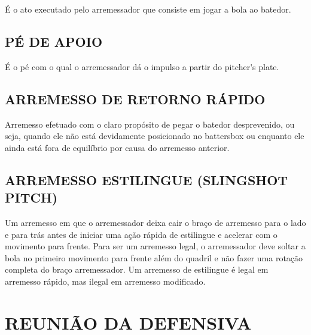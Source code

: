 É o ato executado pelo arremessador que consiste em jogar a bola ao batedor.

\subsection{PÉ DE APOIO}

É o pé com o qual o arremessador dá o impulso a partir do \gls{pitcher's plate}.

\subsection{ARREMESSO DE RETORNO RÁPIDO}

Arremesso efetuado com o claro propósito de pegar o batedor desprevenido, ou seja, quando ele não está devidamente posicionado no \gls{battersbox} ou enquanto ele ainda está fora de equilíbrio por causa do arremesso anterior.

\subsection{ARREMESSO ESTILINGUE (SLINGSHOT PITCH)}

Um arremesso em que o arremessador deixa cair o braço de arremesso para o lado e para trás antes de iniciar uma ação rápida de estilingue e acelerar com o movimento para frente. Para ser um arremesso legal, o arremessador deve soltar a bola no primeiro movimento para frente além do quadril e não fazer uma  rotação completa do braço arremessador. Um arremesso de estilingue é legal em arremesso rápido, mas ilegal em arremesso modificado.

\section{REUNIÃO DA DEFENSIVA}
